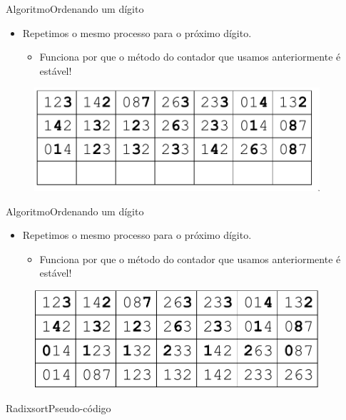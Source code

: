 \documentclass[aspectratio=169]{beamer}
\begin{document}
\begin{frame}{Algoritmo}{Ordenando um dígito}
\begin{itemize}
\item Repetimos o mesmo processo para o próximo dígito.
\begin{itemize}
\item Funciona por que o método do contador que usamos anteriormente é estável!
\end{itemize}
\end{itemize}
\begin{figure}[!h]
  \centering
  \includegraphics[width=300pt]{imgs/radix11.png}
  \label{radix11}
\end{figure}
\end{frame}

\begin{frame}{Algoritmo}{Ordenando um dígito}
\begin{itemize}
\item Repetimos o mesmo processo para o próximo dígito.
\begin{itemize}
\item Funciona por que o método do contador que usamos anteriormente é estável!
\end{itemize}
\end{itemize}
\begin{figure}[!h]
  \centering
  \includegraphics[width=300pt]{imgs/radix12.png}
  \label{radix12}
\end{figure}
\end{frame}

\begin{frame}{Radixsort}{Pseudo-código}
\end{frame}
\end{document}
